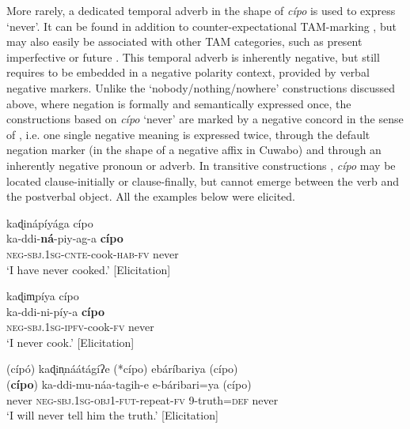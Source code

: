 \documentclass[output=paper,colorlinks=true, citecolor=brown,draftmode]{langscibook}
\begin{document}
More rarely, a dedicated temporal adverb in the shape of \textit{cípo} is used to express ‘never’. It can be found in addition to counter-expectational TAM-marking , but may also easily be associated with other TAM categories, such as present imperfective  or future . This temporal adverb is inherently negative, but still requires to be embedded in a negative polarity context, provided by verbal negative markers. Unlike the ‘nobody/nothing/nowhere’ constructions discussed above, where negation is formally and semantically expressed once, the constructions based on \textit{cípo} ‘never’ are marked by a negative concord in the sense of \citet[9]{Zanuttini1997}, i.e. one single negative meaning is expressed twice, through the default negation marker (in the shape of a negative affix in Cuwabo) and through an inherently negative pronoun or adverb. In transitive constructions , \textit{cípo} may be located clause-initially or clause-finally, but cannot emerge between the verb and the postverbal object. All the examples below were elicited. 

\ea\label{ex:cuw:62}
    \ea\label{ex:cuw:62a} kaɖinápíyága cípo \\ 
        \gll  ka-ddi-\textbf{ná}{}-piy-ag-a \textbf{cípo}  \\
             \textsc{neg-sbj.1sg-cnte}{}-cook-\textsc{hab-fv} never  \\
        \glt  ‘I have never cooked.’ [Elicitation] 

    \ex\label{ex:cuw:62b} kaɖim̩píya cípo\\
        \gll  ka-ddi-ni-píy-a \textbf{cípo} \\
               \textsc{neg-sbj.1sg-ipfv}{}-cook-\textsc{fv} never\\
        \glt  ‘I never cook.’ [Elicitation]
    \z
\z 

\ea\label{ex:cuw:63} (cípó) kaɖin̩náátágíʔe (*cípo) ebáríbariya (cípo) \\ 
    \gll (\textbf{cípo}) ka-ddi-mu-náa-tagih-e {} e-báribari=ya (cípo)  \\
          never \textsc{neg-sbj.1sg-obj1-fut}{}-repeat-\textsc{fv} {} 9-truth=\textsc{def} never  \\
    \glt  ‘I will never tell him the truth.’ [Elicitation]

\z 
\end{document}
